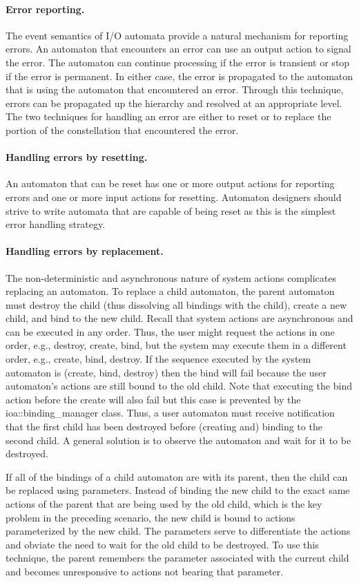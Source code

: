 \paragraph*{Error reporting.}
The event semantics of I/O automata provide a natural mechanism for reporting errors.
An automaton that encounters an error can use an output action to signal the error.
The automaton can continue processing if the error is transient or stop if the error is permanent.
In either case, the error is propagated to the automaton that is using the automaton that encountered an error.
Through this technique, errors can be propagated up the hierarchy and resolved at an appropriate level.
The two techniques for handling an error are either to reset or to replace the portion of the constellation that encountered the error.

\paragraph*{Handling errors by resetting.}
An automaton that can be reset has one or more output actions for reporting errors and one or more input actions for resetting.
Automaton designers should strive to write automata that are capable of being reset as this is the simplest error handling strategy.

\paragraph*{Handling errors by replacement.}
The non-deterministic and asynchronous nature of system actions complicates replacing an automaton.
To replace a child automaton, the parent automaton must destroy the child (thus dissolving all bindings with the child), create a new child, and bind to the new child.
Recall that system actions are asynchronous and can be executed in any order.
Thus, the user might request the actions in one order, e.g., destroy, create, bind, but the system may execute them in a different order, e.g., create, bind, destroy.
If the sequence executed by the system automaton is (create, bind, destroy) then the bind will fail because the user automaton's actions are still bound to the old child.
Note that executing the bind action before the create will also fail but this case is prevented by the ioa::binding\_manager class.
Thus, a user automaton must receive notification that the first child has been destroyed before (creating and) binding to the second child.
A general solution is to observe the automaton and wait for it to be destroyed.

If all of the bindings of a child automaton are with its parent, then the child can be replaced using parameters.
Instead of binding the new child to the exact same actions of the parent that are being used by the old child, which is the key problem in the preceding scenario, the new child is bound to actions parameterized by the new child.
The parameters serve to differentiate the actions and obviate the need to wait for the old child to be destroyed.
To use this technique, the parent remembers the parameter associated with the current child and becomes unresponsive to actions not bearing that parameter.
